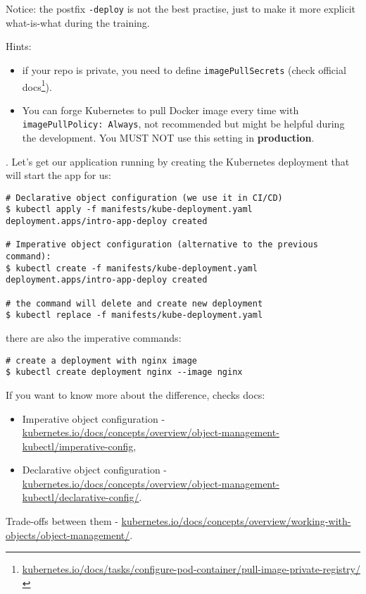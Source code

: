 \documentclass[12pt, letterpaper]{article}
\begin{document}
\inputminted{yaml}{manifests/kube-deployment.yaml}

\smallskip
Notice: the postfix \verb|-deploy| is not the best practise, just to make it more explicit what-is-what during the training.

\smallskip
Hints:
\begin{itemize}
\item if your repo is private, you need to define \verb|imagePullSecrets| (check official docs\footnote{\href{https://kubernetes.io/docs/tasks/configure-pod-container/pull-image-private-registry/}{kubernetes.io/docs/tasks/configure-pod-container/pull-image-private-registry/}}).
\item You can forge Kubernetes to pull Docker image every time with\\ \verb|imagePullPolicy: Always|, not recommended but might be helpful during the development. You MUST NOT use this setting in \textbf{production}.
\end{itemize}

. Let's get our application running by creating the Kubernetes deployment that will start the app for us:

\begin{verbatim}
# Declarative object configuration (we use it in CI/CD)
$ kubectl apply -f manifests/kube-deployment.yaml
deployment.apps/intro-app-deploy created

# Imperative object configuration (alternative to the previous command):
$ kubectl create -f manifests/kube-deployment.yaml
deployment.apps/intro-app-deploy created

# the command will delete and create new deployment
$ kubectl replace -f manifests/kube-deployment.yaml
\end{verbatim}

there are also the imperative commands:

\begin{verbatim}
# create a deployment with nginx image
$ kubectl create deployment nginx --image nginx
\end{verbatim}

If you want to know more about the difference, checks docs:\begin{itemize}
\item Imperative object configuration -\\ \href{https://kubernetes.io/docs/concepts/overview/object-management-kubectl/imperative-config/}{kubernetes.io/docs/concepts/overview/object-management-kubectl/imperative-config},
\item Declarative object configuration -\\ \href{https://kubernetes.io/docs/concepts/overview/object-management-kubectl/declarative-config/}{kubernetes.io/docs/concepts/overview/object-management-kubectl/declarative-config/}.
\end{itemize}
Trade-offs between them - \href{https://kubernetes.io/docs/concepts/overview/working-with-objects/object-management/}{kubernetes.io/docs/concepts/overview/working-with-objects/object-management/}.
\end{document}

